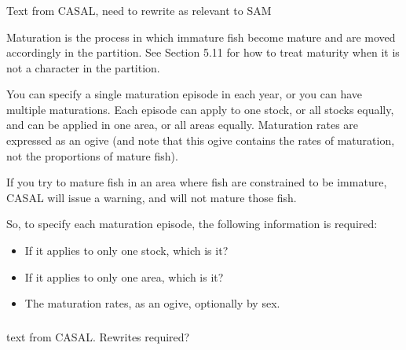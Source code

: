 \subsubsection{}
\KL Text from CASAL, need to rewrite as relevant to SAM \KLend

Maturation is the process in which immature fish become mature and are moved accordingly in the partition. See Section 5.11 for how to treat maturity when it is not a character in the partition.

You can specify a single maturation episode in each year, or you can have multiple maturations. Each episode can apply to one stock, or all stocks equally, and can be applied in one area, or all areas equally. Maturation rates are expressed as an ogive (and note that this ogive contains the rates of maturation, not the proportions of mature fish).

If you try to mature fish in an area where fish are constrained to be immature, CASAL will issue a warning, and will not mature those fish.

So, to specify each maturation episode, the following information is required: 

\begin{itemize}
\item If it applies to only one stock, which is it?
\item If it applies to only one area, which is it?
\item The maturation rates, as an ogive, optionally by sex.
\end{itemize}




\subsubsection{}
\KL text from CASAL. Rewrites required? \KLend



